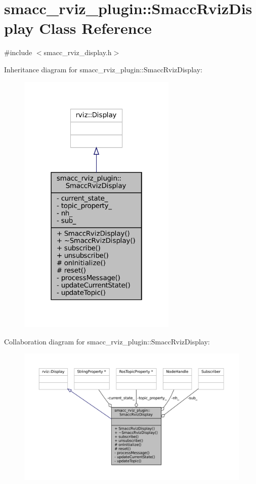 \hypertarget{classsmacc__rviz__plugin_1_1SmaccRvizDisplay}{}\section{smacc\+\_\+rviz\+\_\+plugin\+:\+:Smacc\+Rviz\+Display Class Reference}
\label{classsmacc__rviz__plugin_1_1SmaccRvizDisplay}


{\ttfamily \#include $<$smacc\+\_\+rviz\+\_\+display.\+h$>$}



Inheritance diagram for smacc\+\_\+rviz\+\_\+plugin\+:\+:Smacc\+Rviz\+Display\+:
\nopagebreak
\begin{figure}[H]
\begin{center}
\leavevmode
\includegraphics[width=214pt]{classsmacc__rviz__plugin_1_1SmaccRvizDisplay__inherit__graph}
\end{center}
\end{figure}


Collaboration diagram for smacc\+\_\+rviz\+\_\+plugin\+:\+:Smacc\+Rviz\+Display\+:
\nopagebreak
\begin{figure}[H]
\begin{center}
\leavevmode
\includegraphics[width=350pt]{classsmacc__rviz__plugin_1_1SmaccRvizDisplay__coll__graph}
\end{center}
\end{figure}
